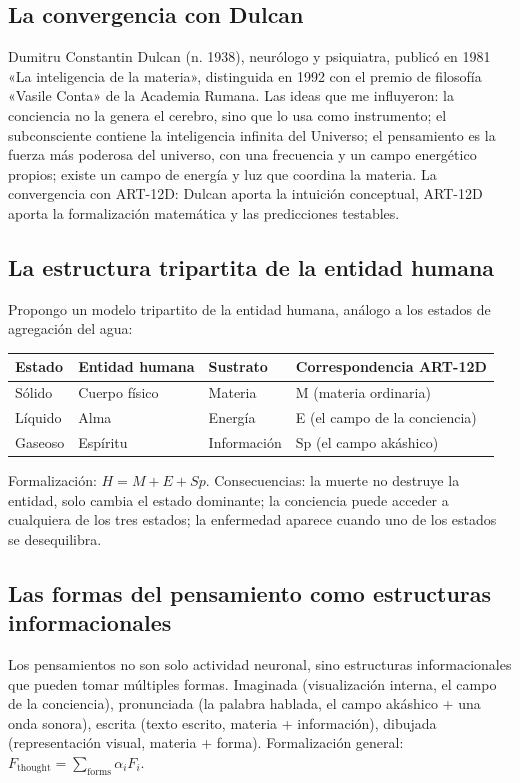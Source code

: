 \documentclass[11pt,a4paper]{article}
\begin{document}
\subsection{La convergencia con Dulcan}
Dumitru Constantin Dulcan (n. 1938), neurólogo y psiquiatra, publicó en 1981 «La inteligencia de la materia», distinguida en 1992 con el premio de filosofía «Vasile Conta» de la Academia Rumana. Las ideas que me influyeron: la conciencia no la genera el cerebro, sino que lo usa como instrumento; el subconsciente contiene la inteligencia infinita del Universo; el pensamiento es la fuerza más poderosa del universo, con una frecuencia y un campo energético propios; existe un campo de energía y luz que coordina la materia. La convergencia con ART-12D: Dulcan aporta la intuición conceptual, ART-12D aporta la formalización matemática y las predicciones testables.

\subsection{La estructura tripartita de la entidad humana}
Propongo un modelo tripartito de la entidad humana, análogo a los estados de agregación del agua:
\begin{table}[H]
\centering
\begin{tabular}{@{}llll@{}}
\toprule
\textbf{Estado} & \textbf{Entidad humana} & \textbf{Sustrato} & \textbf{Correspondencia ART-12D} \\ \midrule
Sólido & Cuerpo físico & Materia & M (materia ordinaria) \\
Líquido & Alma & Energía & E (el campo de la conciencia) \\
Gaseoso & Espíritu & Información & Sp (el campo akáshico) \\ \bottomrule
\end{tabular}
\end{table}
Formalización: $H = M + E + Sp$. Consecuencias: la muerte no destruye la entidad, solo cambia el estado dominante; la conciencia puede acceder a cualquiera de los tres estados; la enfermedad aparece cuando uno de los estados se desequilibra.

\subsection{Las formas del pensamiento como estructuras informacionales}
Los pensamientos no son solo actividad neuronal, sino estructuras informacionales que pueden tomar múltiples formas. Imaginada (visualización interna, el campo de la conciencia), pronunciada (la palabra hablada, el campo akáshico + una onda sonora), escrita (texto escrito, materia + información), dibujada (representación visual, materia + forma). Formalización general: $F_{\text{thought}} = \sum_{\text{forms}} \alpha_i F_i$.
\end{document}
